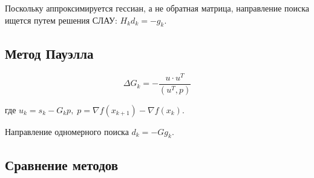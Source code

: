 \documentclass[12pt]{article}
\begin{document}
Поскольку аппроксимируется гессиан, а не обратная матрица, направление поиска ищется путем решения СЛАУ: $H_k d_k = -g_k$.

\subsection{Метод Пауэлла}

\[ \Delta G_k = - \frac{u \cdot u^T}{\left(u^T, p \right)} \]

где $u_k = s_k - G_kp, \; p = \nabla f(x_{k+1}) - \nabla f(x_{k})$.

Направление одномерного поиска $d_k = -Gg_k$.

\subsection{Сравнение методов}
\end{document}
